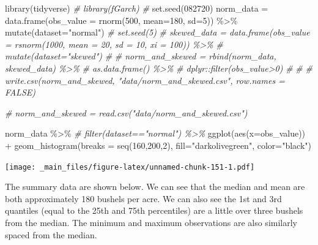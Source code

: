 \documentclass[
]{book}
\newenvironment{Shaded}{\begin{snugshade}}{\end{snugshade}}
\newcommand{\AttributeTok}[1]{\textcolor[rgb]{0.77,0.63,0.00}{#1}}
\newcommand{\CommentTok}[1]{\textcolor[rgb]{0.56,0.35,0.01}{\textit{#1}}}
\newcommand{\DecValTok}[1]{\textcolor[rgb]{0.00,0.00,0.81}{#1}}
\newcommand{\FunctionTok}[1]{\textcolor[rgb]{0.00,0.00,0.00}{#1}}
\newcommand{\NormalTok}[1]{#1}
\newcommand{\OtherTok}[1]{\textcolor[rgb]{0.56,0.35,0.01}{#1}}
\newcommand{\SpecialCharTok}[1]{\textcolor[rgb]{0.00,0.00,0.00}{#1}}
\newcommand{\StringTok}[1]{\textcolor[rgb]{0.31,0.60,0.02}{#1}}
\begin{document}
\begin{Shaded}
\begin{Highlighting}[]
\FunctionTok{library}\NormalTok{(tidyverse)}
\CommentTok{\# library(fGarch)}
\CommentTok{\# }
\FunctionTok{set.seed}\NormalTok{(}\DecValTok{082720}\NormalTok{)}
\NormalTok{norm\_data }\OtherTok{=} \FunctionTok{data.frame}\NormalTok{(}\AttributeTok{obs\_value =} \FunctionTok{rnorm}\NormalTok{(}\DecValTok{500}\NormalTok{, }\AttributeTok{mean=}\DecValTok{180}\NormalTok{, }\AttributeTok{sd=}\DecValTok{5}\NormalTok{)) }\SpecialCharTok{\%\textgreater{}\%}
        \FunctionTok{mutate}\NormalTok{(}\AttributeTok{dataset=}\StringTok{"normal"}\NormalTok{)}
\CommentTok{\# set.seed(5)}
\CommentTok{\# skewed\_data = data.frame(obs\_value = rsnorm(1000, mean = 20, sd = 10, xi = 100)) \%\textgreater{}\%}
\CommentTok{\#         mutate(dataset="skewed")}
\CommentTok{\# }
\CommentTok{\# norm\_and\_skewed = rbind(norm\_data, skewed\_data) \%\textgreater{}\%}
\CommentTok{\#   as.data.frame() \%\textgreater{}\%}
\CommentTok{\#   dplyr::filter(obs\_value\textgreater{}0)}
\CommentTok{\# }
\CommentTok{\# }
\CommentTok{\# write.csv(norm\_and\_skewed, "data/norm\_and\_skewed.csv", row.names = FALSE)}

\CommentTok{\# norm\_and\_skewed = read.csv("data/norm\_and\_skewed.csv")}

\NormalTok{norm\_data }\SpecialCharTok{\%\textgreater{}\%}
        \CommentTok{\# filter(dataset=="normal") \%\textgreater{}\%}
        \FunctionTok{ggplot}\NormalTok{(}\FunctionTok{aes}\NormalTok{(}\AttributeTok{x=}\NormalTok{obs\_value)) }\SpecialCharTok{+}
        \FunctionTok{geom\_histogram}\NormalTok{(}\AttributeTok{breaks =} \FunctionTok{seq}\NormalTok{(}\DecValTok{160}\NormalTok{,}\DecValTok{200}\NormalTok{,}\DecValTok{2}\NormalTok{), }\AttributeTok{fill=}\StringTok{"darkolivegreen"}\NormalTok{, }\AttributeTok{color=}\StringTok{"black"}\NormalTok{)}
\end{Highlighting}
\end{Shaded}

\texttt{[image: \_main\_files/figure-latex/unnamed-chunk-151-1.pdf]}

The summary data are shown below. We can see that the median and mean are both approximately 180 bushels per acre. We can also see the 1st and 3rd quantiles (equal to the 25th and 75th percentiles) are a little over three bushels from the median. The minimum and maximum observations are also similarly spaced from the median.

\begin{Shaded}
\end{Shaded}
\end{document}
